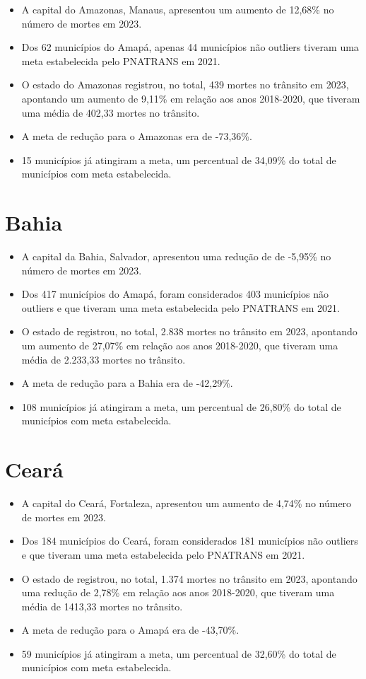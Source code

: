 \documentclass[
  letterpaper,
  DIV=11,
  numbers=noendperiod]{scrreprt}
\begin{document}
\begin{itemize}
\item
  A capital do Amazonas, Manaus, apresentou um aumento de 12,68\% no
  número de mortes em 2023.
\item
  Dos 62 municípios do Amapá, apenas 44 municípios não outliers tiveram
  uma meta estabelecida pelo PNATRANS em 2021.
\item
  O estado do Amazonas registrou, no total, 439 mortes no trânsito em
  2023, apontando um aumento de 9,11\% em relação aos anos 2018-2020,
  que tiveram uma média de 402,33 mortes no trânsito.
\item
  A meta de redução para o Amazonas era de -73,36\%.
\item
  15 municípios já atingiram a meta, um percentual de 34,09\% do total
  de municípios com meta estabelecida.
\end{itemize}

\section{Bahia}\label{bahia}

\begin{itemize}
\item
  A capital da Bahia, Salvador, apresentou uma redução de de -5,95\% no
  número de mortes em 2023.
\item
  Dos 417 municípios do Amapá, foram considerados 403 municípios não
  outliers e que tiveram uma meta estabelecida pelo PNATRANS em 2021.
\item
  O estado de registrou, no total, 2.838 mortes no trânsito em 2023,
  apontando um aumento de 27,07\% em relação aos anos 2018-2020, que
  tiveram uma média de 2.233,33 mortes no trânsito.
\item
  A meta de redução para a Bahia era de -42,29\%.
\item
  108 municípios já atingiram a meta, um percentual de 26,80\% do total
  de municípios com meta estabelecida.
\end{itemize}

\section{Ceará}\label{cearuxe1}

\begin{itemize}
\item
  A capital do Ceará, Fortaleza, apresentou um aumento de 4,74\% no
  número de mortes em 2023.
\item
  Dos 184 municípios do Ceará, foram considerados 181 municípios não
  outliers e que tiveram uma meta estabelecida pelo PNATRANS em 2021.
\item
  O estado de registrou, no total, 1.374 mortes no trânsito em 2023,
  apontando uma redução de 2,78\% em relação aos anos 2018-2020, que
  tiveram uma média de 1413,33 mortes no trânsito.
\item
  A meta de redução para o Amapá era de -43,70\%.
\item
  59 municípios já atingiram a meta, um percentual de 32,60\% do total
  de municípios com meta estabelecida.
\end{itemize}
\end{document}
